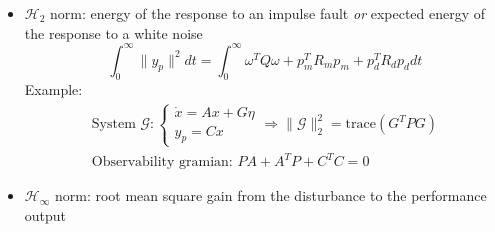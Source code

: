 \documentclass[aspectratio=169, 12pt]{beamer}
\begin{document}
\begin{frame}
  \begin{itemize}
    \item $\mathcal{H}_2$ norm: energy of the response to an impulse fault \textit{or} expected energy of the response to a white noise
    \begin{equation}
      \int_{0}^{\infty}\| y_p \|^2 dt = \int_{0}^{\infty} \omega^T Q \omega + p_{m}^T R_m p_{m} + p_{d}^T R_d p_{d} dt
    \end{equation}
    \textcolor{NTNUViolet}{
    Example: 
    \begin{gather}
      \text{System } \mathcal{G} :
      \begin{cases}
        \dot{x} = A x + G \eta \\
        y_p = C x
      \end{cases}
      \Rightarrow \| \mathcal{G} \|_2^2=\text{trace}\left(G^T P G\right)\\
      \text{Observability gramian: } PA + A^TP+C^TC=0
    \end{gather} 
    }
    \item $\mathcal{H}_{\infty }$ norm: root mean square gain from the disturbance to the performance output
  \end{itemize}
\end{frame}
\end{document}
